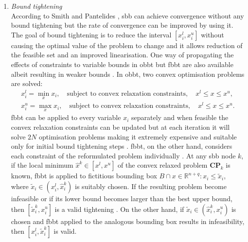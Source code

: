 \begin{enumerate}
	\item \emph{Bound tightening}\\
	According to Smith and Pantelides \cite{Smith:1999aa}, \gls{sbb} can  achieve convergence without any bound tightening but the rate of convergence can be improved by using it. The goal of bound tightening is to reduce the interval $[x_i^l, x_i^u]$ without causing the optimal value of the problem to change and it allows reduction of the feasible set and an improved linearisation. One way of propagating the effects of constraints to variable bounds in \gls{obbt} \cite{Liberti:2006aa,Quesada:1995aa,Smith:1996aa} but \gls{fbbt} are also available albeit resulting in weaker bounds \cite{Liberti:2006aa,Smith:1996aa,Shectman:1998aa,Sahinidis:2003aa}. In \gls{obbt}, two convex optimisation problems are solved:
	\begin{align}
		x_i^l = \min_x x_i, \quad \text{subject to convex relaxation constraints}, \quad x^l \leq x \leq x^u, \\
		x_i^u = \max_x x_i, \quad \text{subject to convex relaxation constraints}, \quad x^l \leq x \leq x^u.
	\end{align}
\gls{fbbt} can be applied to every variable $x_i$ separately and when feasible the convex relaxation constraints can be updated but at each iteration it will solve $2N$ optimisation problems making it extremely expensive and suitable only for initial bound tightening steps \cite{Smith:1999aa}. \gls{fbbt}, on the other hand, considers each constraint of the  reformulated problem individually \cite{Shectman:1998aa}. At any \gls{sbb} node $k$, if the local minimum $\hat{x}^k \in \left[x^l, x^u\right]$ of the convex relaxed problem $\mathbf{CP}_k$ is known, \gls{fbbt} is applied to fictitious bounding box $B \cap {x \in \mathbb{R}^{n+q} : x_i \leq \tilde{x}_i}$, where $\tilde{x}_i \in \left(x_i^l, \hat{x}_i^k\right)$ is suitably chosen. If the resulting problem become infeasible or if its lower bound becomes larger than the best upper bound, then $\left[\tilde{x}_i^k, x_i^u\right]$ is a valid tightening . On the other hand, if $\tilde{x}_i \in \left(\hat{x}_i^k, x_i^u\right)$ is chosen and \gls{fbbt} applied to the analogous bounding box results in infeasibility, then $\left[x_i^l, \tilde{x}_i^k\right]$ is valid.
	

\end{enumerate}
